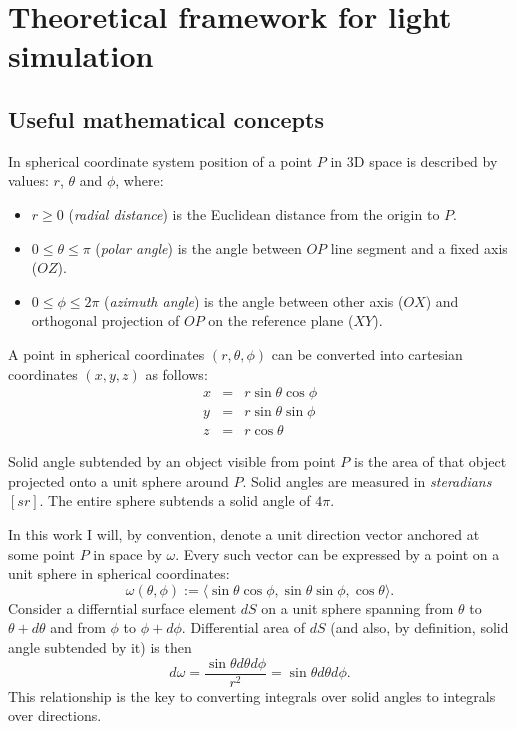 \chapter{Theoretical framework for light simulation}

\section{Useful mathematical concepts}

\begin{df}
In spherical coordinate system position of a point $P$ in 3D space is described by values: $r$, $\theta$ and $\phi$, where:
\begin{itemize}
\item $r \geq 0$ (\emph{radial distance}) is the Euclidean distance from the origin to $P$.
\item $0 \leq \theta \leq \pi$ (\emph{polar angle}) is the angle between $OP$ line segment and a fixed axis ($OZ$).
\item $0 \leq \phi \leq 2\pi$ (\emph{azimuth angle}) is the angle between other axis ($OX$) and orthogonal projection of $OP$ on the reference plane ($XY$).
\end{itemize}
A point in spherical coordinates $(r, \theta, \phi)$ can be converted into cartesian coordinates $(x, y, z)$ as follows:
\begin{eqnarray}
  x &=& r \sin \theta \cos \phi \nonumber \\
  y &=& r \sin \theta \sin \phi \\
  z &=& r \cos \theta \nonumber
\end{eqnarray}
\end{df}

\begin{df}
Solid angle subtended by an object visible from point $P$ is the area of that object projected onto a unit sphere around $P$. Solid angles are measured in \emph{steradians} $[sr]$. The entire sphere subtends a solid angle of $4\pi$.
\end{df}

In this work I will, by convention, denote a unit direction vector anchored at some point $P$ in space by $\omega$. Every such vector can be expressed by a point on a unit sphere in spherical coordinates:
\begin{equation}
  \omega(\theta,\phi) := \langle \sin\theta\cos\phi, \sin\theta\sin\phi, \cos\theta \rangle.
\end{equation}
Consider a differntial surface element $dS$ on a unit sphere spanning from $\theta$ to $\theta + d\theta$ and from $\phi$ to $\phi + d\phi$. Differential area of $dS$ (and also, by definition, solid angle subtended by it) is then
\begin{equation}
  d\omega = \frac{\sin\theta d\theta d\phi}{r^{2}} = \sin\theta d\theta d\phi.
\end{equation}
This relationship is the key to converting integrals over solid angles to integrals over directions.

